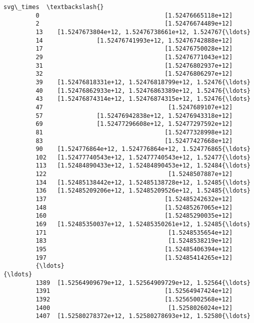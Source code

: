 \documentclass[11pt]{article}
\begin{document}
\begin{Verbatim}[commandchars=\\\{\}]
                                                       svg\_times  \textbackslash{}
         0                                   [1.52476665118e+12]   
         2                                   [1.52476674489e+12]   
         13    [1.5247673804e+12, 1.52476738661e+12, 1.524767{\ldots}   
         14               [1.52476741993e+12, 1.52476742888e+12]   
         17                                  [1.52476750028e+12]   
         29                                  [1.52476771043e+12]   
         31                                  [1.52476802937e+12]   
         32                                  [1.52476806297e+12]   
         39    [1.52476818331e+12, 1.52476818799e+12, 1.52476{\ldots}   
         40    [1.52476862933e+12, 1.52476863389e+12, 1.52476{\ldots}   
         43    [1.52476874314e+12, 1.52476874315e+12, 1.52476{\ldots}   
         47                                   [1.5247689107e+12]   
         57               [1.52476942838e+12, 1.52476943318e+12]   
         69               [1.52477296608e+12, 1.52477297592e+12]   
         81                                  [1.52477328998e+12]   
         83                                  [1.52477427668e+12]   
         90    [1.524776864e+12, 1.524776864e+12, 1.524776865{\ldots}   
         102   [1.52477740543e+12, 1.52477740543e+12, 1.52477{\ldots}   
         113   [1.52484890433e+12, 1.52484890453e+12, 1.52484{\ldots}   
         122                                  [1.5248507887e+12]   
         134   [1.52485138442e+12, 1.52485138728e+12, 1.52485{\ldots}   
         136   [1.52485209206e+12, 1.52485209526e+12, 1.52485{\ldots}   
         137                                 [1.52485242632e+12]   
         148                                 [1.52485267065e+12]   
         160                                 [1.52485290035e+12]   
         169   [1.52485350037e+12, 1.52485350261e+12, 1.52485{\ldots}   
         171                                  [1.5248535654e+12]   
         183                                  [1.5248538219e+12]   
         195                                 [1.52485406394e+12]   
         197                                 [1.52485414265e+12]   
         {\ldots}                                                 {\ldots}   
         1389  [1.52564909679e+12, 1.52564909729e+12, 1.52564{\ldots}   
         1391                                [1.52564947424e+12]   
         1392                                [1.52565002568e+12]   
         1400                                 [1.5258026024e+12]   
         1407  [1.52580278372e+12, 1.52580278693e+12, 1.52580{\ldots}   

\end{Verbatim}
\end{document}
